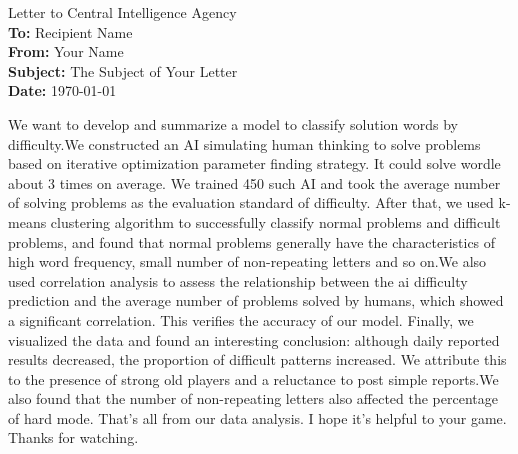 \documentclass[12pt]{article}  %
\begin{document}

\clearpage
\pagestyle{fancy}
\fancyhead{} %
\begin{letter}{Letter to Central Intelligence Agency}
	\textbf{}\\
	\textbf{To:} Recipient Name \\
	\textbf{From:} Your Name \\
	\textbf{Subject:} The Subject of Your Letter \\
	\textbf{Date:} \today \\
	\textbf{}
	\begin{multicols}{2}
	We want to develop and summarize a model to classify solution words by difficulty.We constructed an AI
	simulating human thinking to solve problems based
	on iterative optimization parameter finding strategy.
	It could solve wordle about 3 times on average. We
	trained 450 such AI and took the average number of
	solving problems as the evaluation standard of difficulty. After that, we used k-means clustering algorithm
	to successfully classify normal problems and difficult
	problems, and found that normal problems generally
	have the characteristics of high word frequency, small
	number of non-repeating letters and so on.We also used
	correlation analysis to assess the relationship between
	the ai difficulty prediction and the average number
	of problems solved by humans, which showed a significant correlation. This verifies the accuracy of our
	model.
	Finally, we visualized the data and found an interesting conclusion: although daily reported results decreased, the proportion of difficult patterns increased.
	We attribute this to the presence of strong old players
	and a reluctance to post simple reports.We also found
	that the number of non-repeating letters also affected
	the percentage of hard mode.
	That’s all from our data analysis. I hope it’s helpful
	to your game. Thanks for watching.
	\end{multicols}
	
\end{letter}




\setcounter{savedpage}{\value{page}}
 
\setcounter{page}{\value{savedpage}}
\end{document}
